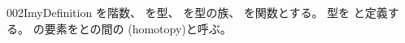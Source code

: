 \documentclass[index]{subfiles}
\begin{document}
\begin{myBlock}{002I}{myDefinition}
  を階数、
  を型、
  を型の族、
  を関数とする。
  型を
  と定義する。
  の要素をとの間の
  (homotopy)と呼ぶ。
\end{myBlock}
\end{document}
